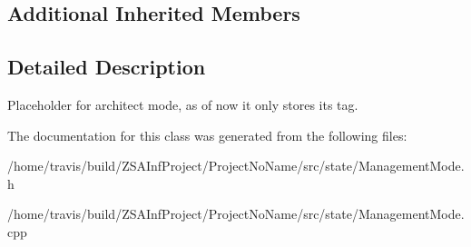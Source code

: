 \subsection*{Additional Inherited Members}


\subsection{Detailed Description}
Placeholder for architect mode, as of now it only stores its tag. 

The documentation for this class was generated from the following files\-:\begin{DoxyCompactItemize}
\item 
/home/travis/build/\-Z\-S\-A\-Inf\-Project/\-Project\-No\-Name/src/state/Management\-Mode.\-h\item 
/home/travis/build/\-Z\-S\-A\-Inf\-Project/\-Project\-No\-Name/src/state/Management\-Mode.\-cpp\end{DoxyCompactItemize}
